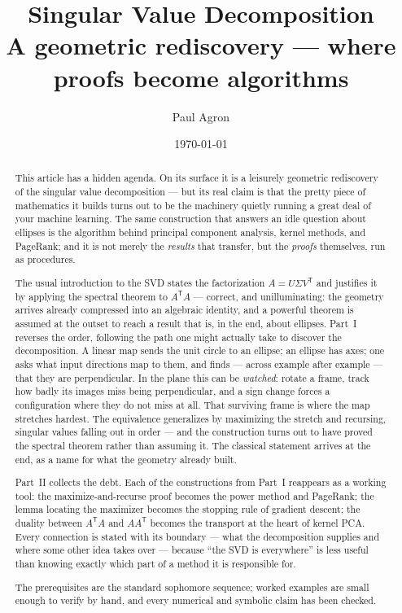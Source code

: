 \documentclass[11pt]{article}
\title{\bfseries Singular Value Decomposition\\[0.3em]
\large\mdseries A geometric rediscovery --- where proofs become algorithms}
\author{Paul Agron}
\date{\today}
\numberwithin{equation}{section}
\newcommand{\T}{^{\mathsf{T}}}
\theoremstyle{plainish}
\begin{document}
\maketitle
\thispagestyle{empty}

\begin{abstract}
\noindent
This article has a hidden agenda. On its surface it is a leisurely geometric
rediscovery of the singular value decomposition --- but its real claim is that
the pretty piece of mathematics it builds turns out to be the machinery quietly
running a great deal of your machine learning. The same construction that
answers an idle question about ellipses is the algorithm behind principal
component analysis, kernel methods, and PageRank; and it is not merely the
\emph{results} that transfer, but the \emph{proofs} themselves, run as
procedures.

The usual introduction to the SVD states the factorization $A = U\Sigma V\T$ and
justifies it by applying the spectral theorem to $A\T A$ --- correct, and
unilluminating: the geometry arrives already compressed into an algebraic
identity, and a powerful theorem is assumed at the outset to reach a result that
is, in the end, about ellipses. Part~I reverses the order, following the path one
might actually take to discover the decomposition. A linear map sends the unit
circle to an ellipse; an ellipse has axes; one asks what input directions map to
them, and finds --- across example after example --- that they are perpendicular.
In the plane this can be \emph{watched}: rotate a frame, track how badly its
images miss being perpendicular, and a sign change forces a configuration where
they do not miss at all. That surviving frame is where the map stretches hardest.
The equivalence generalizes by maximizing the stretch and recursing, singular
values falling out in order --- and the construction turns out to have proved the
spectral theorem rather than assuming it. The classical statement arrives at the
end, as a name for what the geometry already built.

Part~II collects the debt. Each of the constructions from Part~I reappears as a
working tool: the maximize-and-recurse proof becomes the power method and
PageRank; the lemma locating the maximizer becomes the stopping rule of gradient
descent; the duality between $A\T A$ and $AA\T$ becomes the transport at the
heart of kernel PCA. Every connection is stated with its boundary --- what the
decomposition supplies and where some other idea takes over --- because
``the SVD is everywhere'' is less useful than knowing exactly which part of a
method it is responsible for.

The prerequisites are the standard sophomore sequence; worked examples are small
enough to verify by hand, and every numerical and symbolic claim has been
checked.
\end{abstract}
\end{document}
